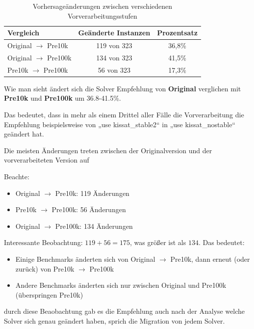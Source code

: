 \begin{table}[H]
    \centering
    \begin{tabular}{lcc}
        \textbf{Vergleich} & \textbf{Geänderte Instanzen} & \textbf{Prozentsatz} \\
        \toprule
        Original $\rightarrow$ Pre10k & 119 von 323 & 36,8\% \\
        \midrule
        Original $\rightarrow$ Pre100k & 134 von 323 & 41,5\% \\
        \midrule
        Pre10k $\rightarrow$ Pre100k & 56 von 323 & 17,3\% \\
        \bottomrule
    \end{tabular}
    \caption{Vorhersageänderungen zwischen verschiedenen Vorverarbeitungsstufen}\label{tab:prediction_changes}
\end{table}

Wie man sieht ändert sich die Solver Empfehlung von \textbf{Original} verglichen mit \textbf{Pre10k} und 
\textbf{Pre100k} um 36.8-41.5\%.

Das bedeutet, dass in mehr als einem Drittel aller Fälle die Vorverarbeitung die Empfehlung 
beispielsweise von „use kissat\_stable2“ in „use kissat\_nostable“ geändert hat.

\newpage

Die meisten Änderungen treten zwischen der Originalversion und der vorverarbeiteten Version auf

Beachte:
\begin{itemize}
    \setlength{\itemsep}{0pt}
    \setlength{\parskip}{0pt}
    \setlength{\parsep}{0pt}
    \item Original $\rightarrow$ Pre10k: 119 Änderungen
    \item Pre10k $\rightarrow$ Pre100k: 56 Änderungen
    \item Original $\rightarrow$ Pre100k: 134 Änderungen
\end{itemize}

Interessante Beobachtung: $119 + 56 = 175$, was größer ist als $134$. Das bedeutet:
\begin{itemize}
    \item Einige Benchmarks änderten sich von Original $\rightarrow$ Pre10k, dann erneut (oder zurück) von Pre10k $\rightarrow$ Pre100k
    \item Andere Benchmarks änderten sich nur zwischen Original und Pre100k (überspringen Pre10k)
\end{itemize}

durch diese Beaobachtung gab es die Empfehlung auch nach der Analyse welche Solver sich genau geändert 
haben, sprich die Migration von jedem Solver.

